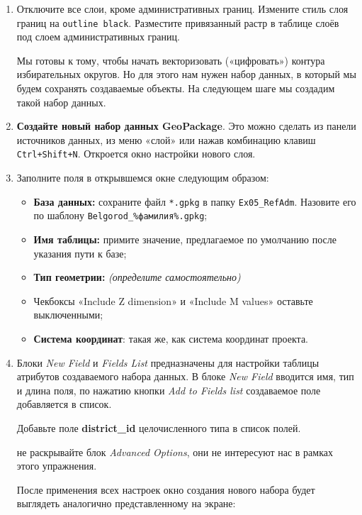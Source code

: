 \documentclass[
  12pt,
]{book}
\providecommand{\tightlist}{%
  \setlength{\itemsep}{0pt}\setlength{\parskip}{0pt}}
\begin{document}
\begin{enumerate}
\def\labelenumi{\arabic{enumi}.}
\item
  Отключите все слои, кроме административных границ. Измените стиль слоя границ на \texttt{outline\ black}. Разместите привязанный растр в таблице слоёв под слоем административных границ.

  Мы готовы к тому, чтобы начать векторизовать («цифровать») контура избирательных округов. Но для этого нам нужен набор данных, в который мы будем сохранять создаваемые объекты. На следующем шаге мы создадим такой набор данных.
\item
  \textbf{Создайте новый набор данных GeoPackage}. Это можно сделать из панели источников данных, из меню «слой» или нажав комбинацию клавиш \texttt{Ctrl+Shift+N}. Откроется окно настройки нового слоя.
\item
  Заполните поля в открывшемся окне следующим образом:

  \begin{itemize}
  \tightlist
  \item
    \textbf{База данных:} сохраните файл \texttt{*.gpkg} в папку \texttt{Ex05\_RefAdm}. Назовите его по шаблону \texttt{Belgorod\_\%фамилия\%.gpkg};
  \item
    \textbf{Имя таблицы:} примите значение, предлагаемое по умолчанию после указания пути к базе;
  \item
    \textbf{Тип геометрии:} \emph{(определите самостоятельно)}
  \item
    Чекбоксы «Include Z dimension» и «Include M values» оставьте выключенными;
  \item
    \textbf{Система координат}: такая же, как система координат проекта.
  \end{itemize}
\item
  Блоки \emph{New Field} и \emph{Fields List} предназначены для настройки таблицы атрибутов создаваемого набора данных. В блоке \emph{New Field} вводится имя, тип и длина поля, по нажатию кнопки \emph{Add to Fields list} создаваемое поле добавляется в список.

  Добавьте поле \textbf{district\_id} целочисленного типа в список полей.

  не раскрывайте блок \emph{Advanced Options}, они не интересуют нас в рамках этого упражнения.

  После применения всех настроек окно создания нового набора будет выглядеть аналогично представленному на экране:


\end{enumerate}
\end{document}
